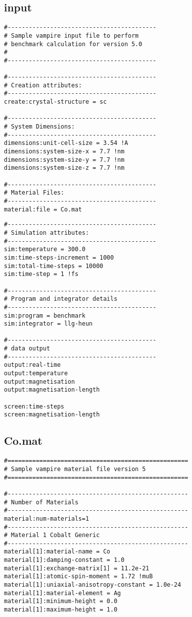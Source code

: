 \subsection*{input}
{\footnotesize
\begin{verbatim}
#------------------------------------------
# Sample vampire input file to perform
# benchmark calculation for version 5.0
#
#------------------------------------------

#------------------------------------------
# Creation attributes:
#------------------------------------------
create:crystal-structure = sc

#------------------------------------------
# System Dimensions:
#------------------------------------------
dimensions:unit-cell-size = 3.54 !A
dimensions:system-size-x = 7.7 !nm
dimensions:system-size-y = 7.7 !nm
dimensions:system-size-z = 7.7 !nm

#------------------------------------------
# Material Files:
#------------------------------------------
material:file = Co.mat
\end{verbatim}
}

{\footnotesize
\begin{verbatim}
#------------------------------------------
# Simulation attributes:
#------------------------------------------
sim:temperature = 300.0
sim:time-steps-increment = 1000
sim:total-time-steps = 10000
sim:time-step = 1 !fs

#------------------------------------------
# Program and integrator details
#------------------------------------------
sim:program = benchmark
sim:integrator = llg-heun

#------------------------------------------
# data output
#------------------------------------------
output:real-time
output:temperature
output:magnetisation
output:magnetisation-length

screen:time-steps
screen:magnetisation-length
\end{verbatim}
}

\subsection*{Co.mat}
{\footnotesize
\begin{verbatim}
#===================================================
# Sample vampire material file version 5
#===================================================

#---------------------------------------------------
# Number of Materials
#---------------------------------------------------
material:num-materials=1
#---------------------------------------------------
# Material 1 Cobalt Generic
#---------------------------------------------------
material[1]:material-name = Co
material[1]:damping-constant = 1.0
material[1]:exchange-matrix[1] = 11.2e-21
material[1]:atomic-spin-moment = 1.72 !muB
material[1]:uniaxial-anisotropy-constant = 1.0e-24
material[1]:material-element = Ag
material[1]:minimum-height = 0.0
material[1]:maximum-height = 1.0
\end{verbatim}
}


